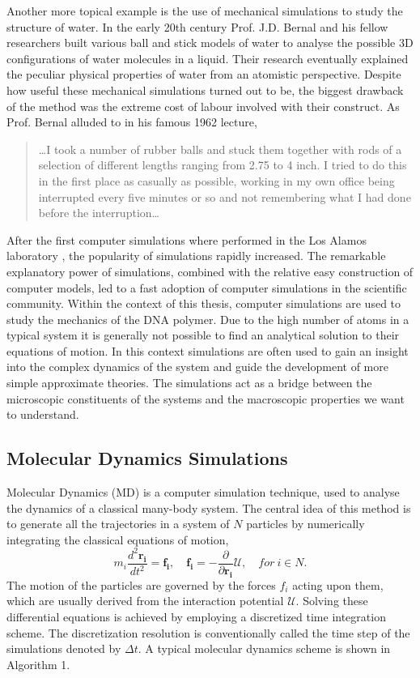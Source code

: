 Another more topical example is the use of mechanical simulations to study the
structure of water.  In the early 20th century Prof. J.D. Bernal and his fellow
researchers built various ball and stick models of water to analyse the possible 3D
configurations of water molecules in a liquid.\cite{Finney_2007} Their research
eventually explained the peculiar physical properties of water from an atomistic
perspective. Despite how useful these mechanical simulations turned out to be, the
biggest drawback of the method was the extreme cost of labour involved with their
construct. As Prof. Bernal alluded to in his famous 1962 lecture,

\begin{quote}
\dots I took a number of rubber balls and stuck them together with rods of a
selection of different lengths ranging from 2.75 to 4 inch. I tried to do this in the
first place as casually as possible, working in my own office being interrupted every
five minutes or so and not remembering what I had done before the interruption\dots
\cite{Bernal1962}
\end{quote}

After the first computer simulations where performed in the Los Alamos laboratory
\cite{Metropolis1953}, the
popularity of simulations rapidly increased. The remarkable explanatory power of
simulations, combined with the relative easy construction of computer models, led to a
fast adoption of computer simulations in the scientific community. Within the context of
this thesis, computer simulations are used to study the mechanics of
the DNA polymer. Due to the high number of atoms in a typical system it is generally
not possible to find an analytical solution to their equations of motion. In this
context simulations are often used to gain an insight into the complex dynamics of the
system and guide the development of more simple approximate theories. The simulations
act as a bridge between the microscopic constituents of the systems and the macroscopic
properties we want to understand.

\subsection{Molecular Dynamics Simulations}
Molecular Dynamics (MD) is a computer simulation technique, used to analyse
the dynamics of a classical many-body system. The central idea of this method is to
generate all the trajectories in a system of $N$ particles by numerically
integrating the classical equations of motion,
\[
m_i \frac{d^2 \boldsymbol{r_i}}{dt^2} = \boldsymbol{f_i}, \quad \boldsymbol{f_i} = -
    \frac{\partial}{\partial \boldsymbol{r_i}} \mathcal{U}, \quad for\ i \in N.
\]
The motion of the particles are governed by the forces $f_i$ acting upon them, which are
usually derived from the interaction potential $\mathcal{U}$.
Solving these differential equations is achieved by employing a discretized time
integration scheme. The discretization resolution is conventionally called the time step
of the simulations denoted by $\Delta t$. A typical molecular dynamics scheme is shown in
Algorithm 1.

